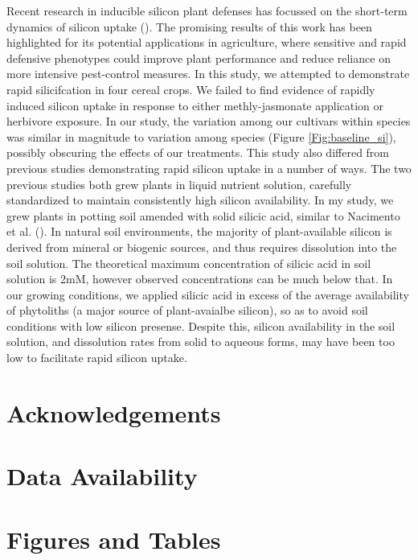 \documentclass[12pt, letterpaper, ]{report}
\begin{document}
Recent research in inducible silicon plant defenses has focussed on the short-term dynamics of silicon uptake (\cite{waterman_short-term_2021,waterman_short-term_2021-1}). The promising results of this work has been highlighted for its potential applications in agriculture, where sensitive and rapid defensive phenotypes could improve plant performance and reduce reliance on more intensive pest-control measures. In this study, we attempted to demonstrate rapid silicifcation in four cereal crops. We failed to find evidence of rapidly induced silicon uptake in response to either methly-jasmonate application or herbivore exposure. In our study, the variation among our cultivars within species was similar in magnitude to variation among species (Figure \ref{Fig:baseline_si}), possibly obscuring the effects of our treatments. This study also differed from previous studies demonstrating rapid silicon uptake in a number of ways. The two previous studies both grew plants in liquid nutrient solution, carefully standardized to maintain consistently high silicon availability. In my study, we grew plants in potting soil amended with solid silicic acid, similar to Nacimento et al. (). In natural soil environments, the majority of plant-available silicon is derived from mineral or biogenic sources, and thus requires dissolution into the soil solution. The theoretical maximum concentration of silicic acid in soil solution is 2mM, however observed concentrations can be much below that. In our growing conditions, we applied silicic acid in excess of the average availability of phytoliths (a major source of plant-avaialbe silicon), so as to avoid soil conditions with low silicon presense. Despite this, silicon availability in the soil solution, and dissolution rates from solid to aqueous forms, may have been too low to facilitate rapid silicon uptake. 

\section{Acknowledgements}

\section{Data Availability}

\printbibliography

\section{Figures and Tables}
\end{document}
